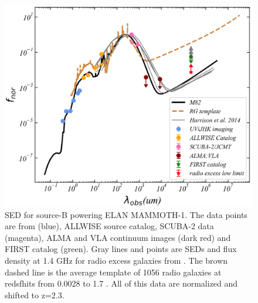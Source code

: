 	\begin{figure}[htp]
		\centering
		\includegraphics[width=\columnwidth]{figs/SED_fitting}
		\caption{SED for source-B powering ELAN MAMMOTH-1. The data points are from \citet{cai2017discovery} (blue), ALLWISE source catalog, SCUBA-2 data \citep{arrigoni2018overdensity} (magenta), ALMA and VLA continuum images \citep{emonts2019cold} (dark red) and FIRST catalog (green). Gray lines and points are SEDs and flux density at 1.4 GHz for radio excess galaxies from \citet{harrison2014kiloparsec}. The brown dashed line is the average template of 1056 radio galaxies at redsfhits from 0.0028 to 1.7 \citep{Toba_2019}. All of this data are normalized and shifted to z=2.3.}
		\label{SED}
	\end{figure}
	

